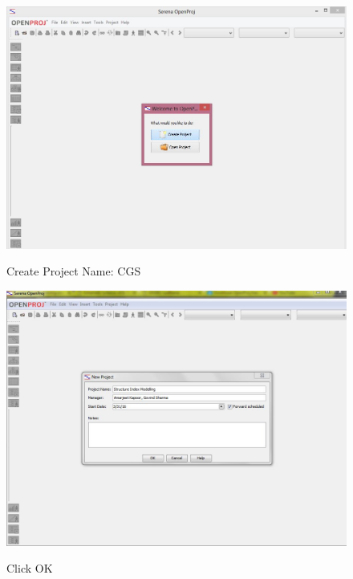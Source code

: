 \begin{figure}[!ht]
\centering
\includegraphics[width=0.7\linewidth]{input/images/image35.jpeg}
\label{fig:image1}
\caption{ Create Project Name: CGS}
\end{figure}

\begin{figure}[!ht]
\centering
\includegraphics[width=0.7\linewidth]{input/images/image36.jpeg}
\label{fig:image1}
\caption{ Click OK}
\end{figure}



